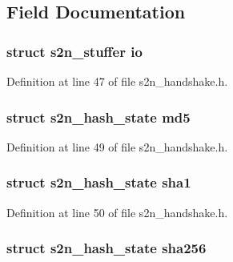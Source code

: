 \subsection{Field Documentation}
\subsubsection[{\texorpdfstring{io}{io}}]{\setlength{\rightskip}{0pt plus 5cm}struct {\bf s2n\+\_\+stuffer} io}\hypertarget{structs2n__handshake_aede0d4a81b6e474b17ea185025c45bfd}{}\label{structs2n__handshake_aede0d4a81b6e474b17ea185025c45bfd}


Definition at line 47 of file s2n\+\_\+handshake.\+h.

\subsubsection[{\texorpdfstring{md5}{md5}}]{\setlength{\rightskip}{0pt plus 5cm}struct {\bf s2n\+\_\+hash\+\_\+state} md5}\hypertarget{structs2n__handshake_aef86a1eeef902f13a68011b824cfe662}{}\label{structs2n__handshake_aef86a1eeef902f13a68011b824cfe662}


Definition at line 49 of file s2n\+\_\+handshake.\+h.

\subsubsection[{\texorpdfstring{sha1}{sha1}}]{\setlength{\rightskip}{0pt plus 5cm}struct {\bf s2n\+\_\+hash\+\_\+state} sha1}\hypertarget{structs2n__handshake_a6cc3a653d5553d51a2c56300e3679a37}{}\label{structs2n__handshake_a6cc3a653d5553d51a2c56300e3679a37}


Definition at line 50 of file s2n\+\_\+handshake.\+h.

\subsubsection[{\texorpdfstring{sha256}{sha256}}]{\setlength{\rightskip}{0pt plus 5cm}struct {\bf s2n\+\_\+hash\+\_\+state} sha256}\hypertarget{structs2n__handshake_a6fbd9191b9b38b2d5501be965b0b6d6c}{}\label{structs2n__handshake_a6fbd9191b9b38b2d5501be965b0b6d6c}


